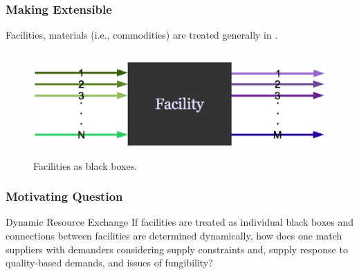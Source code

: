\begin{frame}[ctb!]
  \frametitle{Making \Cyclus Extensible}
  
  Facilities, materials (i.e., commodities) are treated generally in \Cyclus.

  \begin{figure}
    \includegraphics[height=4cm]{./images/facs.eps}
    \caption{Facilities as black boxes. \cite{cyclus2012}}
    \label{fig:facs}  
  \end{figure}

\end{frame}

\begin{frame}[ctb!]
  \frametitle{Motivating Question}
  
  \begin{block}{Dynamic Resource Exchange}
    If facilities are treated as individual black boxes and connections between
    facilities are determined dynamically, how does one match suppliers with
    demanders considering supply constraints and, supply response to
    quality-based demands, and issues of fungibility?
  \end{block}

\end{frame}
